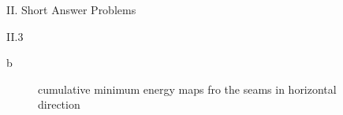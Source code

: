 \documentclass[a4paper,12pt]{article}
\begin{document}
\begin{section}{II. Short Answer Problems}
\begin{subsection}{II.3}
\clearpage
\begin{subsubsection}{b}

\begin{figure}[!htb]
        \caption{cumulative minimum energy maps fro the seams in horizontal direction}
      \end{figure}
      

\end{subsubsection}
\end{subsection}
\end{section}
\end{document}
